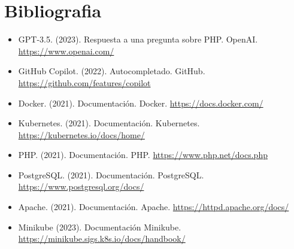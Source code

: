 \documentclass{report}
\begin{document}
    \chapter{Bibliografia}
    \begin{itemize}
        \item GPT-3.5. (2023). Respuesta a una pregunta sobre PHP. OpenAI. \url{https://www.openai.com/}
        \item GitHub Copilot. (2022). Autocompletado. GitHub. \url{https://github.com/features/copilot}
        \item Docker. (2021). Documentación. Docker. \url{https://docs.docker.com/}
        \item Kubernetes. (2021). Documentación. Kubernetes. \url{https://kubernetes.io/docs/home/}
        \item PHP. (2021). Documentación. PHP. \url{https://www.php.net/docs.php}
        \item PostgreSQL. (2021). Documentación. PostgreSQL. \url{https://www.postgresql.org/docs/}
        \item Apache. (2021). Documentación. Apache. \url{https://httpd.apache.org/docs/}
        \item Minikube (2023). Documentación Minikube. \url{https://minikube.sigs.k8s.io/docs/handbook/}
    \end{itemize}
\end{document}
